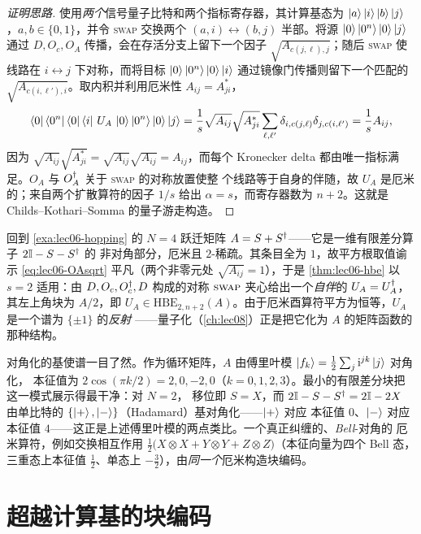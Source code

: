 \begin{proof}[证明思路]
使用\emph{两个}信号量子比特和两个指标寄存器，其计算基态为
$\ket{a}\ket{i}\ket{b}\ket{j}$，$a,b\in\{0,1\}$，并令 \textsc{swap} 交换两个
$(a,i)\leftrightarrow(b,j)$ 半部。将源 $\ket{0}\ket{0^n}\ket{0}\ket{j}$ 通过
$D,O_c,O_A$ 传播，会在存活分支上留下一个因子 $\sqrt{A_{c(j,\ell),j}}$；随后
\textsc{swap} 使线路在 $i\leftrightarrow j$ 下对称，而将目标
$\ket{0}\ket{0^n}\ket{0}\ket{i}$ 通过镜像门传播则留下一个匹配的
$\sqrt{A_{c(i,\ell'),i}}$。取内积并利用厄米性 $A_{ij}=A_{ji}^{\ast}$，
\[
  \bra{0}\bra{0^n}\bra{0}\bra{i}\,U_A\,\ket{0}\ket{0^n}\ket{0}\ket{j}
  =\frac{1}{s}\sqrt{A_{ij}}\sqrt{A_{ji}^{\ast}}
   \sum_{\ell,\ell'}\delta_{i,c(j,\ell)}\delta_{j,c(i,\ell')}
  =\frac{1}{s}A_{ij},
\]
因为 $\sqrt{A_{ij}}\sqrt{A_{ji}^{\ast}}=\sqrt{A_{ij}}\sqrt{A_{ij}}=A_{ij}$，而每个
Kronecker delta 都由唯一指标满足。$O_A$ 与 $O_A^{\dagger}$ 关于 \textsc{swap} 的对称放置使整
个线路等于自身的伴随，故 $U_A$ 是厄米的；来自两个扩散算符的因子 $1/s$ 给出
$\alpha=s$，而寄存器数为 $n+2$。这就是 Childs--Kothari--Somma 的量子游走构造。
\end{proof}

\begin{example}
\label{exa:lec06-hbe-fd}
回到 \cref{exa:lec06-hopping} 的 $N=4$ 跃迁矩阵 $A=S+S^{\dagger}$——它是一维有限差分算子 $2\mathbb{I}-S-S^{\dagger}$ 的
非对角部分，厄米且 $2$-稀疏。其条目全为 $1$，故平方根取值谕示 \eqref{eq:lec06-OAsqrt} 平凡（两个非零元处
$\sqrt{A_{ij}}=1$），于是 \cref{thm:lec06-hbe} 以 $s=2$ 适用：由 $D,O_c,O_c^{\dagger},D$ 构成的对称
$\textsc{swap}$ 夹心给出一个\emph{自伴}的 $U_A=U_A^{\dagger}$，其左上角块为 $A/2$，即
$U_A\in\mathrm{HBE}_{2,n+2}(A)$。由于厄米酉算符平方为恒等，$U_A$ 是一个谱为 $\{\pm1\}$ 的\emph{反射}
——量子化（\cref{ch:lec08}）正是把它化为 $A$ 的矩阵函数的那种结构。

对角化的基使谱一目了然。作为循环矩阵，$A$ 由傅里叶模 $\ket{f_k}=\tfrac12\sum_j\mathrm{i}^{jk}\ket{j}$ 对角化，
本征值为 $2\cos(\pi k/2)=2,0,-2,0$（$k=0,1,2,3$）。最小的有限差分块把这一模式展示得最干净：对 $N=2$，
移位即 $S=X$，而 $2\mathbb{I}-S-S^{\dagger}=2\mathbb{I}-2X$ 由单比特的 $\{\ket+,\ket-\}$（Hadamard）基对角化——$\ket+$ 对应
本征值 $0$、$\ket-$ 对应本征值 $4$——这正是上述傅里叶模的两点类比。一个真正纠缠的、\emph{Bell}-对角的
厄米算符，例如交换相互作用 $\tfrac12\bigl(X\!\otimes\!X+Y\!\otimes\!Y+Z\!\otimes\!Z\bigr)$（本征向量为四个
Bell 态，三重态上本征值 $\tfrac12$、单态上 $-\tfrac32$），由\emph{同一个}厄米构造块编码。
\end{example}

\section{超越计算基的块编码}
\label{sec:lec06-5}

